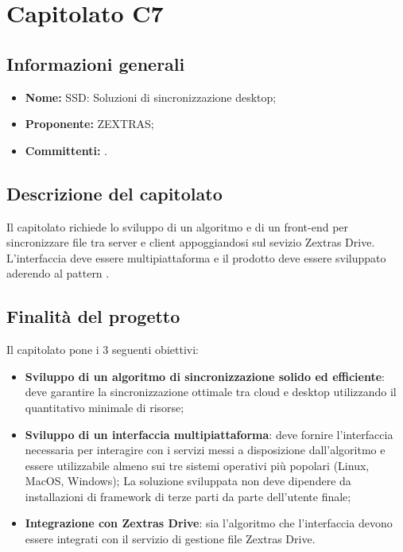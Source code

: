 \section{Capitolato C7}

\subsection{Informazioni generali}
\begin{itemize}
\item \textbf{Nome:} SSD: Soluzioni di sincronizzazione desktop;
\item \textbf{Proponente:} ZEXTRAS;
\item \textbf{Committenti:} \committenti{}.
\end{itemize}

\subsection{Descrizione del capitolato}
Il capitolato richiede lo sviluppo di un algoritmo e di un front-end per sincronizzare file tra server e client appoggiandosi sul sevizio Zextras Drive.
L'interfaccia deve essere multipiattaforma e il prodotto deve essere sviluppato aderendo al pattern .

\subsection{Finalità del progetto}
Il capitolato pone i 3 seguenti obiettivi:
\begin{itemize}
\item \textbf{Sviluppo di un algoritmo di sincronizzazione solido ed efficiente}: deve garantire la sincronizzazione ottimale tra cloud e desktop utilizzando il quantitativo minimale di risorse;
\item \textbf{Sviluppo di un interfaccia multipiattaforma}: deve fornire l'interfaccia necessaria per interagire con i servizi messi a disposizione 
dall'algoritmo e essere utilizzabile almeno sui tre sistemi operativi più popolari (Linux, MacOS, Windows);
La soluzione sviluppata non deve dipendere da installazioni di framework di terze parti da parte dell'utente finale;
\item \textbf{Integrazione con Zextras Drive}: sia l'algoritmo che l'interfaccia devono essere integrati con il servizio di gestione file Zextras Drive.
\end{itemize}

